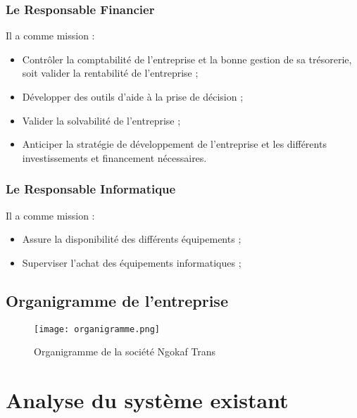             \subsubsection[Le Responsable Financier]{Le Responsable Financier}
            Il a comme mission :
            \par
                \begin{itemize}
                    \setlength{\itemsep}{0pt}
                    \item [\ding{226}] Contrôler la comptabilité de l’entreprise et la bonne
                    gestion de sa trésorerie, soit valider la rentabilité de l’entreprise ;
                    \item [\ding{226}] Développer des outils d’aide à la prise de décision ;
                    \item [\ding{226}] Valider la solvabilité de l’entreprise ;
                    \item [\ding{226}] Anticiper la stratégie de développement de l’entreprise
                    et les différents investissements et financement nécessaires.
                \end{itemize}
            \subsubsection[Le Responsable Informatique]{Le Responsable Informatique}
            Il a comme mission :
            \par
                \begin{itemize}
                    \setlength{\itemsep}{0pt}
                    \item [\ding{226}] Assure la disponibilité des différents équipements ;
                    \item [\ding{226}] Superviser l’achat des équipements informatiques ;
                \end{itemize}
        \subsection[Organigramme de l’entreprise]{Organigramme de l’entreprise}
            \begin{figure}[h!]
                \centering
                \texttt{[image: organigramme.png]}
                \caption{Organigramme de la société Ngokaf Trans}
                \label{fig:Organigramme}
            \end{figure}
    \section[Analyse du système existant]{Analyse du système existant}
